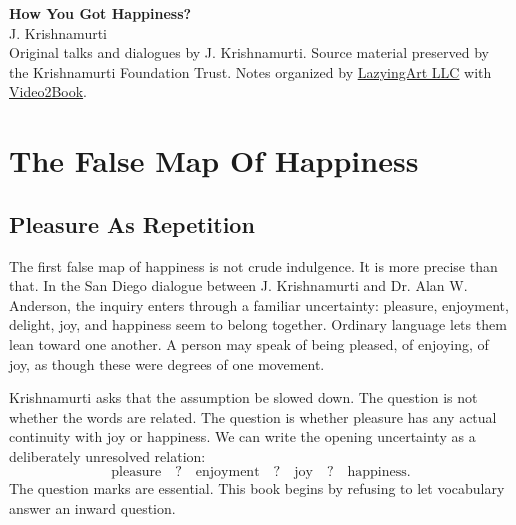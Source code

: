 \documentclass[11pt,oneside]{book}
\begin{document}
\frontmatter

\begin{center}
\vspace*{0.2\textheight}
{\LARGE\bfseries How You Got Happiness?}\\[1em]
{\large J. Krishnamurti}\\[1.5em]
\small Original talks and dialogues by J. Krishnamurti. Source material preserved by the Krishnamurti Foundation Trust. Notes organized by \href{https://lazying.art}{LazyingArt LLC} with \href{https://github.com/lachlanchen/Video2Book}{Video2Book}.
\end{center}
\clearpage
\tableofcontents
\mainmatter


\part{The False Map Of Happiness}

\chapter{Pleasure As Repetition}

The first false map of happiness is not crude indulgence. It is more precise than that. In the San Diego dialogue between J. Krishnamurti and Dr. Alan W. Anderson, the inquiry enters through a familiar uncertainty: pleasure, enjoyment, delight, joy, and happiness seem to belong together. Ordinary language lets them lean toward one another. A person may speak of being pleased, of enjoying, of joy, as though these were degrees of one movement.

Krishnamurti asks that the assumption be slowed down. The question is not whether the words are related. The question is whether pleasure has any actual continuity with joy or happiness. We can write the opening uncertainty as a deliberately unresolved relation:
\begin{equation}
\text{pleasure} \quad ? \quad \text{enjoyment} \quad ? \quad \text{joy} \quad ? \quad \text{happiness}.
\end{equation}
The question marks are essential. This book begins by refusing to let vocabulary answer an inward question.
\end{document}
